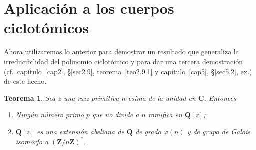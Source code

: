 \documentclass[10pt,oneside,bibtotoc,smallheadings,leqno,a5paper,DIV=12]{scrbook}
\newcommand{\QQ}{\mathbf{Q}}
\newcommand{\ZZ}{\mathbf{Z}}
\newcommand{\CC}{\mathbf{C}}
\numberwithin{equation}{section}
\theoremstyle{defi}
\theoremstyle{enonce}
\newtheorem{theorem}{Teorema}
\theoremstyle{rem}
\numberwithin{theorem}{section}
\numberwithin{proposition}{section}
\numberwithin{definition}{section}
\numberwithin{lemma}{section}
\numberwithin{corollary}{section}
\numberwithin{example}{section}
\numberwithin{footnote}{section}%
\begin{document}
\section{Aplicaci\'on a los cuerpos ciclot\'omicos}\label{sec6.4}

Ahora utilizaremos lo anterior para demostrar un resultado que generaliza la irreducibilidad del polinomio ciclot\'omico
y para dar una tercera demostraci\'on (cf.~cap\'itulo~\ref{cap2}, \S\ref{sec2.9}, teorema~\ref{teo2.9.1}
y cap\'itulo~\ref{cap5}, \S\ref{sec5.2}, ex.) de este hecho.

\begin{theorem}\label{teo6.4.1}
Sea $z$ una ra\'iz primitiva $n$-\'esima de la unidad en $\CC$. Entonces
\begin{enumerate}
\item Ning\'un n\'umero primo $p$ que no divide a $n$ ramifica en $\QQ[z]$;
\item $\QQ[z]$ es una extensi\'on abeliana de $\QQ$ de grado $\varphi(n)$ y de grupo de Galois isomorfo
a $(\ZZ/n\ZZ)^{*}$.
\end{enumerate}
\end{theorem}
\end{document}
